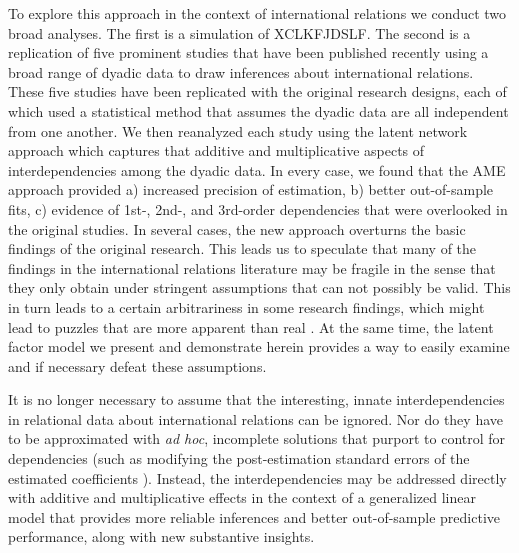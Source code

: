 To explore this approach in the context of international relations we conduct two broad analyses. The first is a simulation of XCLKFJDSLF. The second is a replication of five prominent studies that have been published recently using a broad range of dyadic data to draw inferences about international relations.  These five studies have been replicated with the original research designs, each of which used a statistical method that assumes the dyadic data are all independent from one another.  We then reanalyzed each study using the latent network approach which captures that additive and multiplicative aspects of interdependencies among the dyadic data.  In every case, we found that the AME approach provided a) increased precision of estimation, b) better out-of-sample fits, c) evidence of 1st-, 2nd-, and 3rd-order dependencies that were overlooked in the original studies. In several cases, the new approach overturns the basic findings of the original research.  This leads us to speculate that many of the findings in the international relations literature may be fragile in the sense that they only obtain under stringent assumptions that can not possibly be valid.  This in turn leads to a certain arbitrariness in some research findings, which might lead to puzzles that are more apparent than real \citep{zinnes:1980}.  At the same time, the latent factor model we present and demonstrate herein provides a way to easily examine and if necessary defeat these assumptions.

It is no longer necessary to assume that the interesting, innate interdependencies in relational data about international relations can be ignored. Nor do they have to be approximated with \textit{ad hoc}, incomplete solutions that purport to control for dependencies (such as modifying the post-estimation standard errors of the estimated coefficients \citep{king:roberts:2014}). Instead, the interdependencies may be addressed directly with additive and multiplicative effects in the context of a generalized linear model that provides more reliable inferences and better out-of-sample predictive performance, along with new substantive insights. 